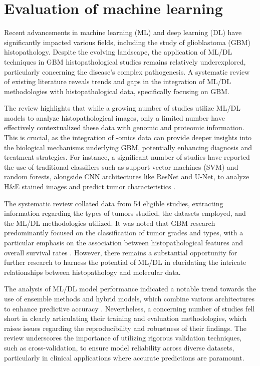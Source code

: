 \documentclass[runningheads]{llncs}
\begin{document}
\section{Evaluation of machine learning}
Recent advancements in machine learning (ML) and deep learning (DL) have significantly impacted various fields, including the study of glioblastoma (GBM) histopathology. Despite the evolving landscape, the application of ML/DL techniques in GBM histopathological studies remains relatively underexplored, particularly concerning the disease's complex pathogenesis. A systematic review of existing literature reveals trends and gaps in the integration of ML/DL methodologies with histopathological data, specifically focusing on GBM. 

The review highlights that while a growing number of studies utilize ML/DL models to analyze histopathological images, only a limited number have effectively contextualized these data with genomic and proteomic information. This is crucial, as the integration of -omics data can provide deeper insights into the biological mechanisms underlying GBM, potentially enhancing diagnosis and treatment strategies. For instance, a significant number of studies have reported the use of traditional classifiers such as support vector machines (SVM) and random forests, alongside CNN architectures like ResNet and U-Net, to analyze H\&E stained images and predict tumor characteristics \cite{Amran_2024, Chun_2025}. 

The systematic review collated data from 54 eligible studies, extracting information regarding the types of tumors studied, the datasets employed, and the ML/DL methodologies utilized. It was noted that GBM research predominantly focused on the classification of tumor grades and types, with a particular emphasis on the association between histopathological features and overall survival rates \cite{Chun_2025}. However, there remains a substantial opportunity for further research to harness the potential of ML/DL in elucidating the intricate relationships between histopathology and molecular data.

The analysis of ML/DL model performance indicated a notable trend towards the use of ensemble methods and hybrid models, which combine various architectures to enhance predictive accuracy \cite{Amran_2024}. Nevertheless, a concerning number of studies fell short in clearly articulating their training and evaluation methodologies, which raises issues regarding the reproducibility and robustness of their findings. The review underscores the importance of utilizing rigorous validation techniques, such as cross-validation, to ensure model reliability across diverse datasets, particularly in clinical applications where accurate predictions are paramount.
\end{document}

